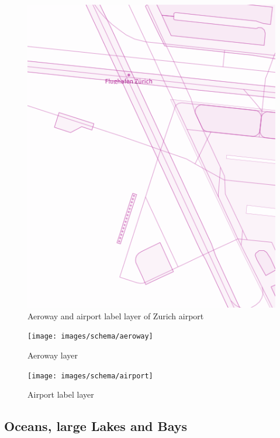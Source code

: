 \begin{minipage}[t]{0.48\linewidth}
    \vspace{-20pt}
    \begin{figure}[H]
      \centering
      \includegraphics[width=1\textwidth]{images/schema/aeroway_example}
      \caption{Aeroway and airport label layer of Zurich airport}
    \end{figure}
\end{minipage}

\begin{figure}[H]
  \centering
  \texttt{[image: images/schema/aeroway]}
  \caption{Aeroway layer}
\end{figure}

\begin{figure}[H]
  \centering
  \texttt{[image: images/schema/airport]}
  \caption{Airport label layer}
\end{figure}

\subsection{Oceans, large Lakes and Bays}

